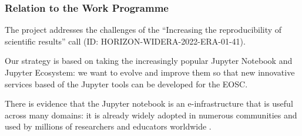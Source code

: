 %

\label{sect:workprogramme}
\subsubsection{Relation to the Work Programme}

The \TheProject project addresses the challenges of the
``Increasing the reproducibility of scientific results'' call (ID: HORIZON-WIDERA-2022-ERA-01-41).

Our strategy is based on taking the increasingly popular Jupyter
Notebook and Jupyter Ecosystem: we want to evolve and improve them
so that new innovative services based of the Jupyter tools can be developed for
the EOSC.
\medskip


There is evidence that the Jupyter notebook is an e-infrastructure
that is useful across many domains: it is already widely adopted in
numerous communities and used by millions of researchers and educators worldwide
\cite{jupyter-grant}.

